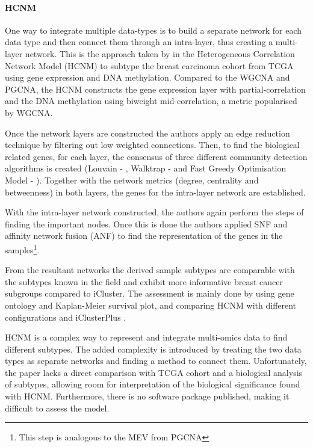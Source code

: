\paragraph*{HCNM} \label{s:lit:HCNM}

One way to integrate multiple data-types is to build a separate network for each data type and then connect them through an intra-layer, thus creating a multi-layer network. This is the approach taken by \citet{Vangimalla2021-fc} in the Heterogeneous Correlation Network Model (HCNM) to subtype the breast carcinoma cohort from TCGA using gene expression and DNA methylation. Compared to the WGCNA and PGCNA, the HCNM constructs the gene expression layer with partial-correlation and the DNA methylation using biweight mid-correlation, a metric popularised by WGCNA. 

Once the network layers are constructed the authors apply an edge reduction technique by filtering out low weighted connections. Then, to find the biological related genes, for each layer, the consensus of three different community detection algorithms is created (Louvain - \citet{Blondel2008-ik}, Walktrap - \citet{Pons2005-oa} and Fast Greedy Optimisation Model - \cite{Clauset2004-em}). Together with the network metrics (degree, centrality and betweenness) in both layers, the genes for the intra-layer network are established.

With the intra-layer network constructed, the authors again perform the steps of finding the important nodes. Once this is done the authors applied SNF and affinity network fusion (ANF) to find the representation of the genes in the samples\footnote{This step is analogous to the MEV from PGCNA}. 

From the resultant networks the derived sample subtypes are comparable with the subtypes known in the field and exhibit more informative breast cancer subgroups compared to iCluster. The assessment is mainly done by using gene ontology and Kaplan-Meier survival plot, and comparing HCNM with different configurations and iClusterPlus \citep{Mo2013-zi}. 

HCNM is a complex way to represent and integrate multi-omics data to find different subtypes. The added complexity is introduced by treating the two data types as separate networks and finding a method to connect them. Unfortunately, the paper lacks a direct comparison with TCGA cohort and a biological analysis of subtypes, allowing room for interpretation of the biological significance found with HCNM. Furthermore, there is no software package published, making it difficult to assess the model. 

